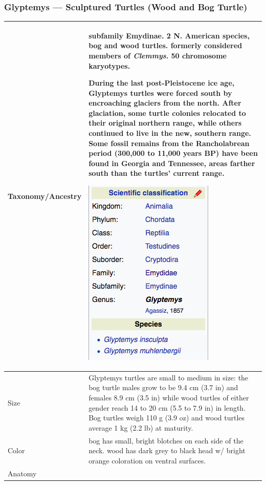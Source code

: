 \subsubsection{Glyptemys --- Sculptured Turtles (Wood and Bog Turtle)}
\begin{center}
\begin{longtabu} to 

	\hline
	Taxonomy/Ancestry &
	subfamily Emydinae. 2 N. American species, bog and wood turtles. formerly considered members of \emph{Clemmys}. 50 chromosome karyotypes.
	
	During the last post-Pleistocene ice age, Glyptemys turtles were forced south by encroaching glaciers from the north. After glaciation, some turtle colonies relocated to their original northern range, while others continued to live in the new, southern range. Some fossil remains from the Rancholabrean period (300,000 to 11,000 years BP) have been found in Georgia and Tennessee, areas farther south than the turtles' current range.
	
	\begin{center} \includegraphics[scale=0.5]{testudines/emydidae/glyptemys/tax} \end{center}
	 \\
	\hline
	Size & 
	Glyptemys turtles are small to medium in size: the bog turtle males grow to be 9.4 cm (3.7 in) and females 8.9 cm (3.5 in) while wood turtles of either gender reach 14 to 20 cm (5.5 to 7.9 in) in length. Bog turtles weigh 110 g (3.9 oz) and wood turtles average 1 kg (2.2 lb) at maturity.
	\\
	\hline
	Color &
	bog has small, bright blotches on each side of the neck. wood has dark grey to black head w/ bright orange coloration on ventral surfaces.
	 \\
	\hline
	Anatomy &
	

\end{longtabu}
\end{center}
